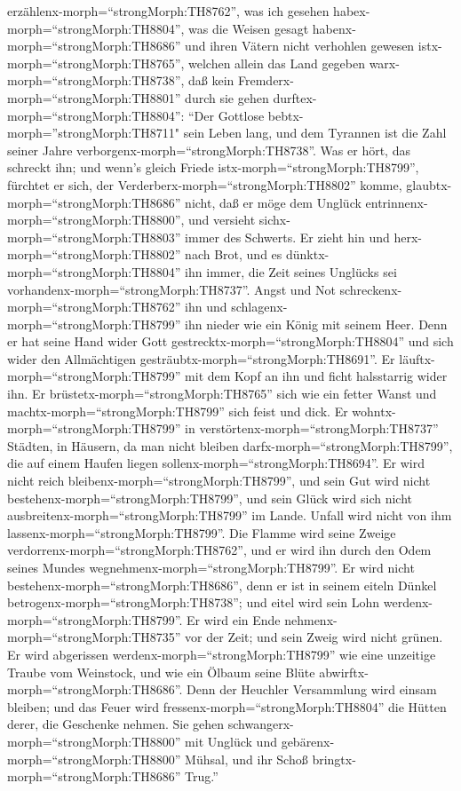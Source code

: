 erzählenx-morph=``strongMorph:TH8762'', was ich gesehen
habex-morph=``strongMorph:TH8804'',  was die Weisen gesagt
habenx-morph=``strongMorph:TH8686'' und ihren Vätern nicht verhohlen
gewesen istx-morph=``strongMorph:TH8765'',  welchen allein
das Land gegeben warx-morph=``strongMorph:TH8738'', daß kein
Fremderx-morph=``strongMorph:TH8801'' durch sie gehen
durftex-morph=``strongMorph:TH8804'':  ``Der Gottlose
bebtx-morph=''strongMorph:TH8711" sein Leben lang, und dem Tyrannen ist
die Zahl seiner Jahre verborgenx-morph=``strongMorph:TH8738''.
 Was er hört, das schreckt ihn; und wenn's gleich Friede
istx-morph=``strongMorph:TH8799'', fürchtet er sich, der
Verderberx-morph=``strongMorph:TH8802'' komme, 
glaubtx-morph=``strongMorph:TH8686'' nicht, daß er möge dem Unglück
entrinnenx-morph=``strongMorph:TH8800'', und versieht
sichx-morph=``strongMorph:TH8803'' immer des Schwerts.  Er
zieht hin und herx-morph=``strongMorph:TH8802'' nach Brot, und es
dünktx-morph=``strongMorph:TH8804'' ihn immer, die Zeit seines Unglücks
sei vorhandenx-morph=``strongMorph:TH8737''.  Angst und Not
schreckenx-morph=``strongMorph:TH8762'' ihn und
schlagenx-morph=``strongMorph:TH8799'' ihn nieder wie ein König mit
seinem Heer.  Denn er hat seine Hand wider Gott
gestrecktx-morph=``strongMorph:TH8804'' und sich wider den Allmächtigen
gesträubtx-morph=``strongMorph:TH8691''.  Er
läuftx-morph=``strongMorph:TH8799'' mit dem Kopf an ihn und ficht
halsstarrig wider ihn.  Er
brüstetx-morph=``strongMorph:TH8765'' sich wie ein fetter Wanst und
machtx-morph=``strongMorph:TH8799'' sich feist und dick. 
Er wohntx-morph=``strongMorph:TH8799'' in
verstörtenx-morph=``strongMorph:TH8737'' Städten, in Häusern, da man
nicht bleiben darfx-morph=``strongMorph:TH8799'', die auf einem Haufen
liegen sollenx-morph=``strongMorph:TH8694''.  Er wird nicht
reich bleibenx-morph=``strongMorph:TH8799'', und sein Gut wird nicht
bestehenx-morph=``strongMorph:TH8799'', und sein Glück wird sich nicht
ausbreitenx-morph=``strongMorph:TH8799'' im Lande.  Unfall
wird nicht von ihm lassenx-morph=``strongMorph:TH8799''. Die Flamme wird
seine Zweige verdorrenx-morph=``strongMorph:TH8762'', und er wird ihn
durch den Odem seines Mundes wegnehmenx-morph=``strongMorph:TH8799''.
 Er wird nicht bestehenx-morph=``strongMorph:TH8686'', denn
er ist in seinem eiteln Dünkel betrogenx-morph=``strongMorph:TH8738'';
und eitel wird sein Lohn werdenx-morph=``strongMorph:TH8799''.
 Er wird ein Ende nehmenx-morph=``strongMorph:TH8735'' vor
der Zeit; und sein Zweig wird nicht grünen.  Er wird
abgerissen werdenx-morph=``strongMorph:TH8799'' wie eine unzeitige
Traube vom Weinstock, und wie ein Ölbaum seine Blüte
abwirftx-morph=``strongMorph:TH8686''.  Denn der Heuchler
Versammlung wird einsam bleiben; und das Feuer wird
fressenx-morph=``strongMorph:TH8804'' die Hütten derer, die Geschenke
nehmen.  Sie gehen schwangerx-morph=``strongMorph:TH8800''
mit Unglück und gebärenx-morph=``strongMorph:TH8800'' Mühsal, und ihr
Schoß bringtx-morph=``strongMorph:TH8686'' Trug.''

